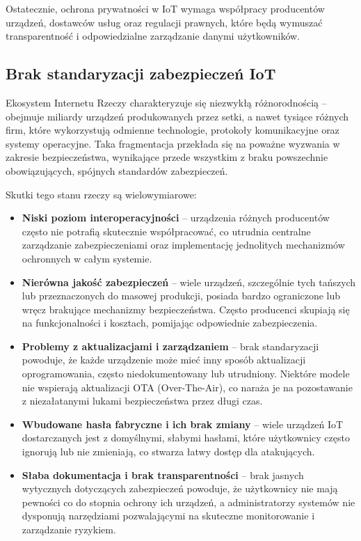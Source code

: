 Ostatecznie, ochrona prywatności w IoT wymaga współpracy producentów urządzeń, dostawców usług oraz regulacji prawnych, które będą wymuszać transparentność i odpowiedzialne zarządzanie danymi użytkowników.
\subsection{Brak standaryzacji zabezpieczeń IoT}

Ekosystem Internetu Rzeczy charakteryzuje się niezwykłą różnorodnością – obejmuje miliardy urządzeń produkowanych przez setki, a nawet tysiące różnych firm, które wykorzystują odmienne technologie, protokoły komunikacyjne oraz systemy operacyjne. Taka fragmentacja przekłada się na poważne wyzwania w zakresie bezpieczeństwa, wynikające przede wszystkim z braku powszechnie obowiązujących, spójnych standardów zabezpieczeń.

Skutki tego stanu rzeczy są wielowymiarowe:

\begin{itemize}
\item \textbf{Niski poziom interoperacyjności} – urządzenia różnych producentów często nie potrafią skutecznie współpracować, co utrudnia centralne zarządzanie zabezpieczeniami oraz implementację jednolitych mechanizmów ochronnych w całym systemie.

\item \textbf{Nierówna jakość zabezpieczeń} – wiele urządzeń, szczególnie tych tańszych lub przeznaczonych do masowej produkcji, posiada bardzo ograniczone lub wręcz brakujące mechanizmy bezpieczeństwa. Często producenci skupiają się na funkcjonalności i kosztach, pomijając odpowiednie zabezpieczenia.

\item \textbf{Problemy z aktualizacjami i zarządzaniem} – brak standaryzacji powoduje, że każde urządzenie może mieć inny sposób aktualizacji oprogramowania, często niedokumentowany lub utrudniony. Niektóre modele nie wspierają aktualizacji OTA (Over-The-Air), co naraża je na pozostawanie z niezałatanymi lukami bezpieczeństwa przez długi czas.

\item \textbf{Wbudowane hasła fabryczne i ich brak zmiany} – wiele urządzeń IoT dostarczanych jest z domyślnymi, słabymi hasłami, które użytkownicy często ignorują lub nie zmieniają, co stwarza łatwy dostęp dla atakujących.

\item \textbf{Słaba dokumentacja i brak transparentności} – brak jasnych wytycznych dotyczących zabezpieczeń powoduje, że użytkownicy nie mają pewności co do stopnia ochrony ich urządzeń, a administratorzy systemów nie dysponują narzędziami pozwalającymi na skuteczne monitorowanie i zarządzanie ryzykiem.
\end{itemize}

